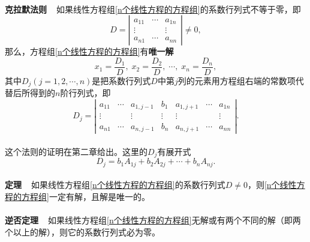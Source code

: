 \paragraph{}
\textbf{克拉默法则~~}如果线性方程组\eqref{n个线性方程的方程组}的系数行列式不等于零，即
\begin{equation*}
  D = \left|\begin{array}{ccc}
    a_{11} & \cdots & a_{1n} \\
    \vdots & & \vdots \\
    a_{n1} & \cdots & a_{nn}
  \end{array} \right| \neq 0,
\end{equation*}
那么，方程组\eqref{n个线性方程的方程组}有\textbf{唯一解}
\begin{equation}
x_1 = \frac{D_1}{D}, \; x_2 = \frac{D_2}{D}, \; \cdots, \; x_n = \frac{D_n}{D},
\end{equation}
其中$D_j(j=1,2,\cdots,n)$是把系数行列式$D$中第$j$列的元素用方程组右端的常数项代替后所得到的$n$阶行列式，即
\begin{equation*}
  D_j = \left|\begin{array}{ccccccc}
    a_{11} & \cdots & a_{1,j-1} & b_1 & a_{1,j+1} & \cdots & a_{1n} \\
    \vdots &  & \vdots & \vdots & \vdots & & \vdots \\
    a_{n1} & \cdots & a_{n,j-1} & b_n & a_{n,j+1} & \cdots & a_{nn}
  \end{array} \right|.
\end{equation*}

\paragraph{}
这个法则的证明在第二章给出。这里的$D_j$有展开式
\begin{equation*}
  D_j = b_1A_{1j} + b_2A_{2j} + \cdots + b_nA_{nj}.
\end{equation*}

\paragraph{}
\textbf{定理~~}如果线性方程组\eqref{n个线性方程的方程组}的系数行列式$D\neq 0$，则\eqref{n个线性方程的方程组}一定有解，且解是唯一的。

\paragraph{}
\textbf{逆否定理~~}如果线性方程组\eqref{n个线性方程的方程组}无解或有两个不同的解（{\color{gray!50}即两个以上的解}），则它的系数行列式必为零。

